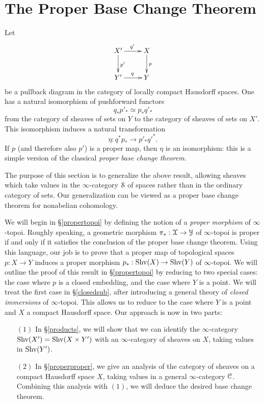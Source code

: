 \section{The Proper Base Change Theorem}\label{chap7sec3}

\setcounter{theorem}{0}

Let 
$$ \xymatrix{ X' \ar[r]^{q'} \ar[d]^{p'} & X \ar[d]^{p} \\
Y' \ar[r]^{q} & Y }$$
be a pullback diagram in the category of locally compact Hausdorff spaces. One has a natural isomorphism of pushforward functors $$  q_{\ast} p'_{\ast} \simeq p_{\ast} q'_{\ast}$$
from the category of sheaves of sets on $Y$ to the category of sheaves of sets on $X'$. This isomorphism induces a natural transformation
$$ \eta: q^{\ast} p_{\ast} \rightarrow p'_{\ast} {q'}^{\ast}.$$
If $p$ (and therefore also $p'$) is a proper map, then $\eta$ is an isomorphism: this is a simple version of the classical {\it proper base change theorem}.

The purpose of this section is to generalize the above result, allowing sheaves which take values in the $\infty$-category $\operatorname{\mathcal{S}}$ of spaces rather than in the ordinary category of sets. Our generalization can be viewed as a proper base change theorem for nonabelian cohomology. 

We will begin in \S \ref{propertopoi} by defining the notion of a {\em proper morphism} of $\infty$-topoi. Roughly speaking, a geometric morphism $\pi_{\ast}: \operatorname{\mathcal{X}} \rightarrow \operatorname{\mathcal{Y}}$ of $\infty$-topoi is proper if and only if it satisfies the conclusion of the proper base change theorem. Using this language, our job is to prove that a proper map of topological spaces $p: X \rightarrow Y$ induces a proper morphism $p_{\ast}: \operatorname{Shv}(X) \rightarrow \operatorname{Shv}(Y)$ of $\infty$-topoi. We will outline the proof of this result in \S \ref{propertopoi} by reducing to two special cases: the case where $p$ is a closed embedding, and the case where $Y$ is a point. We will treat the first case in \S \ref{closedsub},
after introducing a general theory of {\em closed immersions} of $\infty$-topoi. This allows us to reduce to the case where $Y$ is a point and $X$ a compact Hausdorff space. Our approach is now in two parts:

\begin{itemize}
\item[$(1)$] In \S \ref{products}, we will show that we can identify the $\infty$-category 
$\operatorname{Shv}(X') = \operatorname{Shv}(X \times Y')$ with an $\infty$-category of sheaves on $X$, taking values in 
$\operatorname{Shv}(Y')$.
\item[$(2)$] In \S \ref{properproper}, we give an analysis of the category of sheaves
on a compact Hausdorff space $X$, taking values in a general $\infty$-category
$\operatorname{\mathcal{C}}$. Combining this analysis with $(1)$, we will deduce the desired base change theorem.
\end{itemize}

